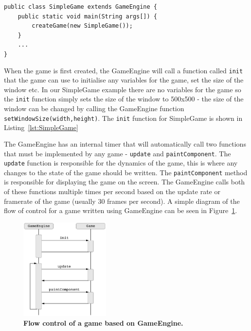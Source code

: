 \documentclass[a4paper, 10pt]{report}
\begin{document}
\begin{lstlisting}[caption=Example showing a game called SimpleGame that uses GameEngine (must be written in a file named SimpleGame.java)., label=lst:SimpleGameSetup]
public class SimpleGame extends GameEngine {
    public static void main(String args[]) {
        createGame(new SimpleGame());
    }
    ...
}
\end{lstlisting}

When the game is first created, the GameEngine will call a function called {\tt init} that the game can use to initialise any variables for the game, set the size of the window etc. In our SimpleGame example there are no variables for the game so the {\tt init} function simply sets the size of the window to 500x500 - the size of the window can be changed by calling the GameEngine function {\tt setWindowSize(width,height)}. The {\tt init} function for SimpleGame is shown in Listing~\ref{lst:SimpleGame}

The GameEngine has an internal timer that will automatically call two functions that must be implemented by any game - {\tt update} and {\tt paintComponent}. The {\tt update} function is responsible for the dynamics of the game, this is where any changes to the state of the game should be written. The {\tt paintComponent} method is responsible for displaying the game on the screen. The GameEngine calls both of these functions multiple times per second based on the update rate or framerate of the game (usually 30 frames per second). A simple diagram of the flow of control for a game written using GameEngine can be seen in Figure~\ref{fig:GameEngineFlowControl}.

\begin{figure}[htbp]
\begin{center}
\includegraphics[width=0.4\textwidth]{GameEngine}
\caption{{\bf Flow control of a game based on GameEngine.}}
\label{fig:GameEngineFlowControl}
\end{center}
\end{figure}
\end{document}
